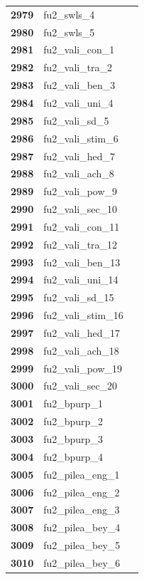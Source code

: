 \documentclass[
  letterpaper,
  DIV=11,
  numbers=noendperiod]{scrartcl}
\begin{document}
\begin{longtable}[t]{>{}cll}
\textbf{2979} & fu2\_swls\_4 & \\
\textbf{2980} & fu2\_swls\_5 & \\
\addlinespace
\textbf{2981} & fu2\_vali\_con\_1 & \\
\textbf{2982} & fu2\_vali\_tra\_2 & \\
\textbf{2983} & fu2\_vali\_ben\_3 & \\
\textbf{2984} & fu2\_vali\_uni\_4 & \\
\textbf{2985} & fu2\_vali\_sd\_5 & \\
\addlinespace
\textbf{2986} & fu2\_vali\_stim\_6 & \\
\textbf{2987} & fu2\_vali\_hed\_7 & \\
\textbf{2988} & fu2\_vali\_ach\_8 & \\
\textbf{2989} & fu2\_vali\_pow\_9 & \\
\textbf{2990} & fu2\_vali\_sec\_10 & \\
\addlinespace
\textbf{2991} & fu2\_vali\_con\_11 & \\
\textbf{2992} & fu2\_vali\_tra\_12 & \\
\textbf{2993} & fu2\_vali\_ben\_13 & \\
\textbf{2994} & fu2\_vali\_uni\_14 & \\
\textbf{2995} & fu2\_vali\_sd\_15 & \\
\addlinespace
\textbf{2996} & fu2\_vali\_stim\_16 & \\
\textbf{2997} & fu2\_vali\_hed\_17 & \\
\textbf{2998} & fu2\_vali\_ach\_18 & \\
\textbf{2999} & fu2\_vali\_pow\_19 & \\
\textbf{3000} & fu2\_vali\_sec\_20 & \\
\addlinespace
\textbf{3001} & fu2\_bpurp\_1 & \\
\textbf{3002} & fu2\_bpurp\_2 & \\
\textbf{3003} & fu2\_bpurp\_3 & \\
\textbf{3004} & fu2\_bpurp\_4 & \\
\textbf{3005} & fu2\_pilea\_eng\_1 & \\
\addlinespace
\textbf{3006} & fu2\_pilea\_eng\_2 & \\
\textbf{3007} & fu2\_pilea\_eng\_3 & \\
\textbf{3008} & fu2\_pilea\_bey\_4 & \\
\textbf{3009} & fu2\_pilea\_bey\_5 & \\
\textbf{3010} & fu2\_pilea\_bey\_6 & \\

\end{longtable}
\end{document}
